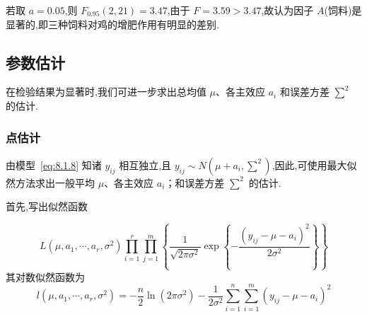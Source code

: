 若取 $a=0.05$,则 $F_{0.95} (2, 21)=3.47$,由于 $F=3.59>3.47$,故认为因子 $A$(饲料)是显著的,即三种饲料对鸡的增肥作用有明显的差别.

\subsection{参数估计}

在检验结果为显著时,我们可进一步求出总均值 $\mu$、各主效应 $a_i$ 和误差方差 $\sum^2$ 的估计.

\subsubsection{点估计}

由模型~\eqref{eq:8.1.8} 知诸 $y_{ij}$ 相互独立,且 $y_{ij}\sim N(\mu+a_i,\sum^2)$,因此,可使用最大似然方法求出一般平均 $\mu$、各主效应 $a_i$；和误差方差 $\sum^2$ 的估计.

首先,写出似然函数

\begin{equation*}
  L\left(\mu, a_{1}, \cdots, a_{r}, \sigma^{2}\right) \prod_{i=1}^{r} \prod_{j=1}^{m}\left\{\frac{1}{\sqrt{2 \pi \sigma^{2}}} \exp \left\{-\frac{\left(y_{i j}-\mu-a_{i}\right)^{2}}{2 \sigma^{2}}\right\}\right\}
\end{equation*}
其对数似然函数为
\begin{equation*}
  l\left(\mu, a_{1}, \cdots, a_{r}, \sigma^{2}\right)=-\frac{n}{2} \ln \left(2 \pi \sigma^{2}\right)-\frac{1}{2 \sigma^{2}} \sum_{i=1}^{n} \sum_{i=1}^{m}\left(y_{i j}-\mu-a_{i}\right)^{2}
\end{equation*}

